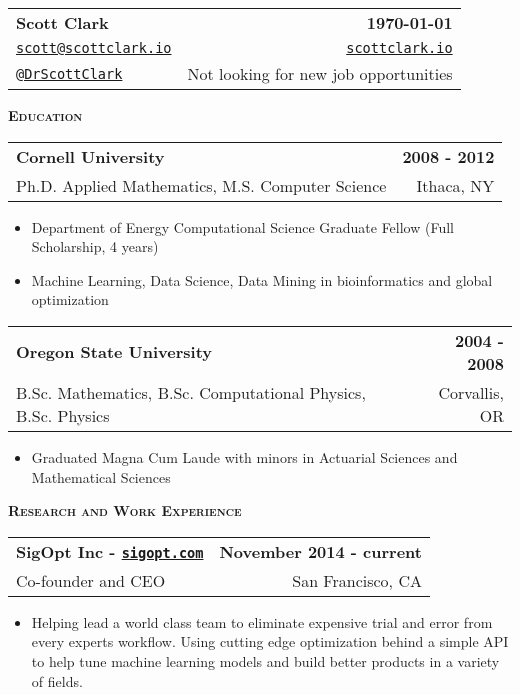 \documentclass[letterpaper, 11pt]{article}
\makeatletter
\renewcommand{\section}[1]{%
  \begin{tcolorbox}
    \textsc{\textbf{\large{#1}}}
  \end{tcolorbox}
}
\newcommand{\entry}[4]{%
  \begin{tabularx}{\linewidth}{@{}Xr@{}}
    \textbf{#1} & \textbf{#4} \\
    #3          & #2          \\
  \end{tabularx}
}
\newcommand{\email}[1]{\href{mailto:#1}{\texttt{#1}}}
\newcommand{\website}[1]{\href{http://#1}{\texttt{#1}}}
\newcommand{\twitter}[1]{\href{https://twitter.com/#1}{\texttt{@#1}}}
\makeatother
\begin{document}
  \begin{tabularx}{\linewidth}{@{}Xr@{}}
    \textbf{\Large{Scott Clark}} & \textbf{\today}                       \\
    \email{scott@scottclark.io}  & \website{scottclark.io}               \\
    \twitter{DrScottClark}       & Not looking for new job opportunities \\
  \end{tabularx}

  \section{Education}

  \entry{Cornell University}{Ithaca, NY}{Ph.D. Applied Mathematics, M.S. Computer Science}{2008 - 2012}
  \begin{itemize}
    \item{Department of Energy Computational Science Graduate Fellow (Full Scholarship, 4 years)}
    \item{Machine Learning, Data Science, Data Mining in bioinformatics and global optimization}
  \end{itemize}

  \entry{Oregon State University}{Corvallis, OR}{B.Sc. Mathematics, B.Sc. Computational Physics, B.Sc. Physics}{2004 - 2008}
  \begin{itemize}
    \item{Graduated Magna Cum Laude with minors in Actuarial Sciences and Mathematical Sciences}
  \end{itemize}

  \section{Research and Work Experience}

  \entry{SigOpt Inc - \website{sigopt.com}}{San Francisco, CA}{Co-founder and CEO}{November 2014 - current}
  \begin{itemize}
    \item{Helping lead a world class team to eliminate expensive trial and error from every experts workflow. Using cutting edge optimization behind a simple API to help tune machine learning models and build better products in a variety of fields.}
  \end{itemize}
\end{document}
